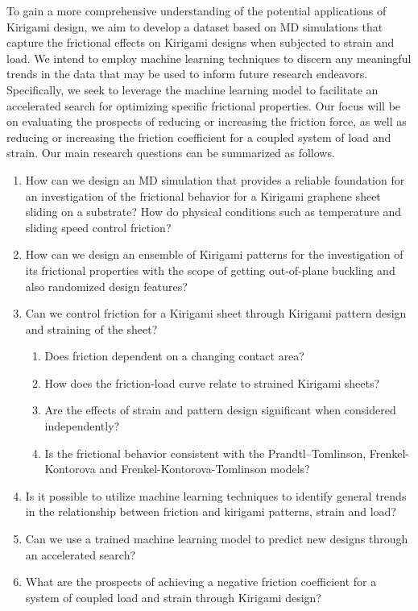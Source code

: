 To gain a more comprehensive understanding of the potential applications of Kirigami design, we aim to develop a dataset based on \acrshort{MD} simulations that capture the frictional effects on Kirigami designs when subjected to strain and load. We intend to employ machine learning techniques to discern any meaningful trends in the data that may be used to inform future research endeavors. Specifically, we seek to leverage the machine learning model to facilitate an accelerated search for optimizing specific frictional properties. Our focus will be on evaluating the prospects of reducing or increasing the friction force, as well as reducing or increasing the friction coefficient for a coupled system of load and strain. Our main research questions can be summarized as follows.


\begin{enumerate}
  \item  How can we design an \acrshort{MD} simulation that provides a reliable foundation for an investigation of the frictional behavior for a Kirigami graphene sheet sliding on a substrate? How do physical conditions such as temperature and sliding speed control friction?
  \item How can we design an ensemble of Kirigami patterns for the investigation of its frictional properties with the scope of getting out-of-plane buckling and also randomized design features?   
  \item Can we control friction for a Kirigami sheet through Kirigami pattern design and straining of the sheet?
  \begin{enumerate}
    \item Does friction dependent on a changing contact area?
    \item How does the friction-load curve relate to strained Kirigami sheets?
    \item Are the effects of strain and pattern design significant when considered independently?
    \item Is the frictional behavior consistent with the Prandtl–Tomlinson, Frenkel-Kontorova and Frenkel-Kontorova-Tomlinson models? 
  \end{enumerate}
  \item Is it possible to utilize machine learning techniques to identify general trends in the relationship between friction and kirigami patterns, strain and load?
  \item Can we use a trained machine learning model to predict new designs through an accelerated search?
  \item What are the prospects of achieving a negative friction coefficient for a system of coupled load and strain through Kirigami design?
\end{enumerate}



